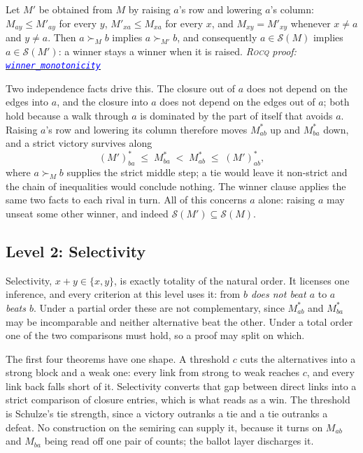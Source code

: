 \documentclass[a4paper,UKenglish,cleveref,autoref,thm-restate,anonymous]{lipics-v2021}
\newcommand{\Mstar}{M^{\ast}}
\newcommand{\rocq}{\textsc{Rocq}}
\newcommand{\anonrepo}{https://anonymous.4open.science/r/Semiring_graph_algorithm-000E}
\newcommand{\rocqfile}[2]{\href{\anonrepo/#1}{\textcolor{blue}{\texttt{#2}}}}
\newcommand{\proofat}[2]{{\footnotesize\itshape\rocq{} proof: \rocqfile{#1}{#2}}}
\begin{document}
\begin{theorem}[Monotonicity]\label{thm:monotone}
Let $M'$ be obtained from $M$ by raising $a$'s row and lowering $a$'s
column: $M_{ay} \leq M'_{ay}$ for every $y$, $M'_{xa} \leq M_{xa}$ for every
$x$, and $M_{xy} = M'_{xy}$ whenever $x \neq a$ and $y \neq a$. Then
$a \succ_M b$ implies $a \succ_{M'} b$, and consequently
$a \in \mathcal{S}(M)$ implies $a \in \mathcal{S}(M')$: a winner stays a
winner when it is raised.
\proofat{algorithm/MonotonicityN.v}{winner\_monotonicity}
\end{theorem}

Two independence facts drive this. The closure out of $a$ does not depend on
the edges into $a$, and the closure into $a$ does not depend on the edges out
of $a$; both hold because a walk through $a$ is dominated by the part of
itself that avoids $a$. Raising $a$'s row and lowering its column therefore
moves $\Mstar_{ab}$ up and $\Mstar_{ba}$ down, and a strict victory survives
along
\[
  (M')^{\ast}_{ba} \;\leq\; \Mstar_{ba} \;<\; \Mstar_{ab} \;\leq\;
  (M')^{\ast}_{ab},
\]
where $a \succ_M b$ supplies the strict middle step; a tie would leave it
non-strict and the chain of inequalities would conclude nothing. The winner clause applies
the same two facts to each rival in turn. All of this concerns $a$ alone:
raising $a$ may unseat some other winner, and indeed
$\mathcal{S}(M') \subseteq \mathcal{S}(M)$.



\subsection{Level 2: Selectivity}

Selectivity, $x + y \in \{x,y\}$, is exactly totality of the natural order.
It licenses one inference, and every criterion at this level uses it:
from \emph{$b$ does not beat $a$} to \emph{$a$ beats $b$}. Under a partial
order these are not complementary, since $\Mstar_{ab}$ and $\Mstar_{ba}$
may be incomparable and neither alternative beat the other. Under a total
order one of the two comparisons must hold, so a proof may split on which.

The first four theorems have one shape. A threshold $c$ cuts the
alternatives into a strong block and a weak one: every link from strong to
weak reaches $c$, and every link back falls short of it. Selectivity
converts that gap between direct links into a strict comparison of closure
entries, which is what  reads as a win. The threshold is
Schulze's tie strength, since a victory outranks a tie and a tie outranks
a defeat. No construction on the semiring can supply it, because it turns
on $M_{ab}$ and $M_{ba}$ being read off one pair of counts; the ballot
layer discharges it.
\end{document}
